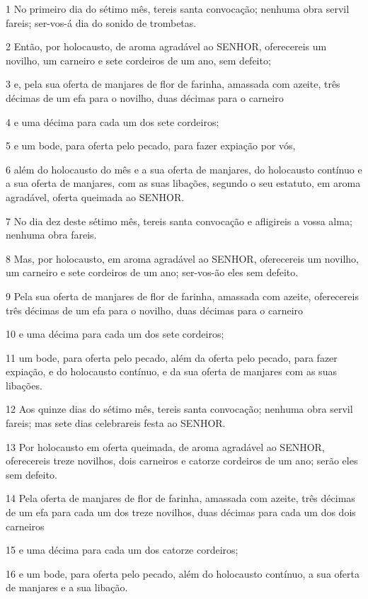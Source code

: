 \par 1 No primeiro dia do sétimo mês, tereis santa convocação; nenhuma obra servil fareis; ser-vos-á dia do sonido de trombetas.
\par 2 Então, por holocausto, de aroma agradável ao SENHOR, oferecereis um novilho, um carneiro e sete cordeiros de um ano, sem defeito;
\par 3 e, pela sua oferta de manjares de flor de farinha, amassada com azeite, três décimas de um efa para o novilho, duas décimas para o carneiro
\par 4 e uma décima para cada um dos sete cordeiros;
\par 5 e um bode, para oferta pelo pecado, para fazer expiação por vós,
\par 6 além do holocausto do mês e a sua oferta de manjares, do holocausto contínuo e a sua oferta de manjares, com as suas libações, segundo o seu estatuto, em aroma agradável, oferta queimada ao SENHOR.
\par 7 No dia dez deste sétimo mês, tereis santa convocação e afligireis a vossa alma; nenhuma obra fareis.
\par 8 Mas, por holocausto, em aroma agradável ao SENHOR, oferecereis um novilho, um carneiro e sete cordeiros de um ano; ser-vos-ão eles sem defeito.
\par 9 Pela sua oferta de manjares de flor de farinha, amassada com azeite, oferecereis três décimas de um efa para o novilho, duas décimas para o carneiro
\par 10 e uma décima para cada um dos sete cordeiros;
\par 11 um bode, para oferta pelo pecado, além da oferta pelo pecado, para fazer expiação, e do holocausto contínuo, e da sua oferta de manjares com as suas libações.
\par 12 Aos quinze dias do sétimo mês, tereis santa convocação; nenhuma obra servil fareis; mas sete dias celebrareis festa ao SENHOR.
\par 13 Por holocausto em oferta queimada, de aroma agradável ao SENHOR, oferecereis treze novilhos, dois carneiros e catorze cordeiros de um ano; serão eles sem defeito.
\par 14 Pela oferta de manjares de flor de farinha, amassada com azeite, três décimas de um efa para cada um dos treze novilhos, duas décimas para cada um dos dois carneiros
\par 15 e uma décima para cada um dos catorze cordeiros;
\par 16 e um bode, para oferta pelo pecado, além do holocausto contínuo, a sua oferta de manjares e a sua libação.
